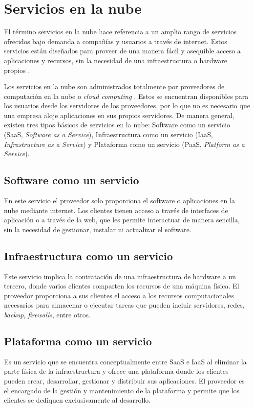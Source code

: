 \section{Servicios en la nube}
El término servicios en la nube hace referencia a un amplio rango de servicios ofrecidos bajo demanda a compañías y usuarios a través de internet. Estos servicios están diseñados para proveer de una manera fácil y asequible acceso a aplicaciones y recursos, sin la necesidad de una infraestructura o hardware propios \cite{cs_def}.

Los servicios en la nube son administrados totalmente por proveedores de computación en la nube o \textit{cloud computing} \cite{cs_def}. Estos se encuentran disponibles para los usuarios desde los servidores de los proveedores, por lo que no es necesario que una empresa aloje aplicaciones en sus propios servidores. De manera general, existen tres tipos básicos de servicios en la nube: Software como un servicio (SaaS, \textit{Software as a Service}), Infraestructura como un servicio (IaaS, \textit{Infrastructure as a Service}) y Plataforma como un servicio (PaaS, \textit{Platform as a Service}).

\subsection{Software como un servicio}
En este servicio el proveedor solo proporciona el software o aplicaciones en la nube mediante internet. Los clientes tienen acceso a través de interfaces de aplicación o a través de la web, que les permite interactuar de manera sencilla, sin la necesidad de gestionar, instalar ni actualizar el software.

\subsection{Infraestructura como un servicio}
Este servicio implica la contratación de una infraestructura de hardware a un tercero, donde varios clientes comparten los recursos de una máquina física. El proveedor proporciona a sus clientes el acceso a los recursos computacionales necesarios para almacenar o ejecutar tareas que pueden incluir servidores, redes, \textit{backup}, \textit{firewalls}, entre otros.

\subsection{Plataforma como un servicio}
Es un servicio que se encuentra conceptualmente entre SaaS e IaaS al eliminar la parte física de la infraestructura y ofrece una plataforma donde los clientes pueden crear, desarrollar, gestionar y distribuir sus aplicaciones. El proveedor es el encargado de la gestión y mantenimiento de la plataforma y permite que los clientes se dediquen exclusivamente al desarrollo.

